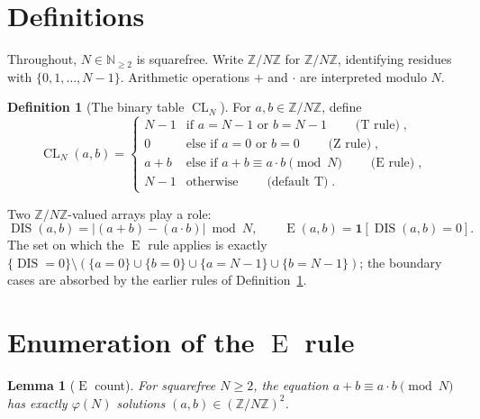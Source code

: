 \documentclass[11pt,reqno]{amsart}
\theoremstyle{plain}
\newtheorem{lemma}[theorem]{Lemma}
\theoremstyle{definition}
\newtheorem{definition}[theorem]{Definition}
\theoremstyle{remark}
\DeclareMathOperator{\DIS}{DIS}
\DeclareMathOperator{\CL}{CL}
\DeclareMathOperator{\ECHO}{E}
\DeclareMathOperator{\HARM}{T}
\DeclareMathOperator{\VOID}{Z}
\newcommand{\ZN}{\mathbb{Z}/N\mathbb{Z}}
\newcommand{\Z}{\mathbb{Z}}
\newcommand{\N}{\mathbb{N}}
\begin{document}
\section{Definitions}\label{sec:def}

Throughout, $N\in\N_{\ge 2}$ is squarefree. Write $\ZN$ for
$\Z/N\Z$, identifying residues with $\{0,1,\dots,N-1\}$. Arithmetic
operations $+$ and $\cdot$ are interpreted modulo $N$.

\begin{definition}[The binary table $\CL_N$]\label{def:cl}
For $a,b\in\ZN$, define
\begin{equation}\label{eq:cl-def}
  \CL_N(a,b)=
  \begin{cases}
     N-1 & \text{if } a=N-1 \text{ or } b=N-1
           \qquad\text{($\HARM$ rule)},\\[1pt]
     0   & \text{else if } a=0 \text{ or } b=0
           \qquad\text{($\VOID$ rule)},\\[1pt]
     a+b & \text{else if } a+b\equiv a\cdot b\pmod N
           \qquad\text{($\ECHO$ rule)},\\[1pt]
     N-1 & \text{otherwise}
           \qquad\text{(default $\HARM$)}.
  \end{cases}
\end{equation}
\end{definition}

Two $\ZN$-valued arrays play a role:
\begin{equation}\label{eq:dis-def}
  \DIS(a,b)=\bigl\lvert (a+b)-(a\cdot b)\bigr\rvert\bmod N,
  \qquad
  \ECHO(a,b)=\mathbf{1}\!\left[\DIS(a,b)=0\right].
\end{equation}
The set on which the $\ECHO$ rule applies is exactly
$\{\DIS=0\}\setminus(\{a=0\}\cup\{b=0\}\cup\{a=N-1\}\cup\{b=N-1\})$;
the boundary cases are absorbed by the earlier rules of
Definition~\ref{def:cl}.

\section{Enumeration of the $\ECHO$ rule}\label{sec:enum}

\begin{lemma}[$\ECHO$ count]\label{lem:echo}
For squarefree $N\ge 2$, the equation $a+b\equiv a\cdot b\pmod N$ has
\emph{exactly} $\varphi(N)$ solutions $(a,b)\in(\ZN)^{2}$.
\end{lemma}
\end{document}
